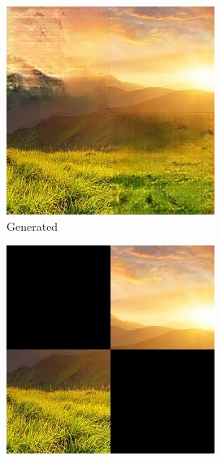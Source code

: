 \documentclass[sigconf]{acmart}
\begin{document}
\begin{figure}[h]
    \centering
    \begin{subfigure}[b]{0.3\linewidth}
        \includegraphics[width=\linewidth]{output1.jpg}
        \caption{Generated}
    \end{subfigure}
    \hfill
    \begin{subfigure}[b]{0.3\linewidth}
        \includegraphics[width=\linewidth]{input1.jpg}

\end{subfigure}
\end{figure}
\end{document}
